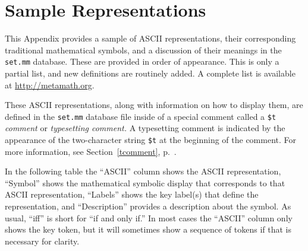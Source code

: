 \appendix
\chapter{Sample Representations}
\label{ASCII}

This Appendix provides a sample of {\sc ASCII} representations,
their corresponding traditional mathematical symbols,
and a discussion of their meanings
in the \texttt{set.mm} database.
These are provided in order of appearance.
This is only a partial list, and new definitions are routinely added.
A complete list is available at \url{http://metamath.org}.

These {\sc ASCII} representations, along
with information on how to display them,
are defined in the \texttt{set.mm} database file inside of
a special comment called a \texttt{\$t} {\em
comment} or {\em typesetting
comment.}
A typesetting comment
is indicated by the appearance of the
two-character string \texttt{\$t} at the beginning of the comment.
For more information,
see Section~\ref{tcomment}, p.~\pageref{tcomment}.

In the following table the ``{\sc ASCII}'' column shows the {\sc ASCII}
representation,
``Symbol'' shows the mathematical symbolic display
that corresponds to that {\sc ASCII} representation, ``Labels'' shows
the key label(s) that define the representation, and
``Description'' provides a description about the symbol.
As usual, ``iff'' is short for ``if and only if.''
In most cases the ``{\sc ASCII}'' column only shows
the key token, but it will sometimes show a sequence of tokens
if that is necessary for clarity.

